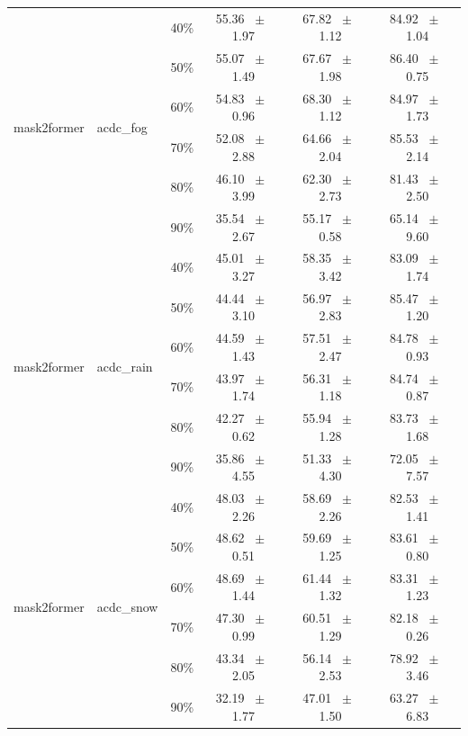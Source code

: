 \begin{table}[h]
\begin{tabular}{@{}l l c c c c@{}}
    \midrule
    \multirow{6}{*}{mask2former} & \multirow{6}{*}{acdc_fog} & 40\% & 55.36 ~$\pm$~ 1.97 & 67.82 ~$\pm$~ 1.12 & 84.92 ~$\pm$~ 1.04 \\
    & & 50\% & 55.07 ~$\pm$~ 1.49 & 67.67 ~$\pm$~ 1.98 & 86.40 ~$\pm$~ 0.75 \\
    & & 60\% & 54.83 ~$\pm$~ 0.96 & 68.30 ~$\pm$~ 1.12 & 84.97 ~$\pm$~ 1.73 \\
    & & 70\% & 52.08 ~$\pm$~ 2.88 & 64.66 ~$\pm$~ 2.04 & 85.53 ~$\pm$~ 2.14 \\
    & & 80\% & 46.10 ~$\pm$~ 3.99 & 62.30 ~$\pm$~ 2.73 & 81.43 ~$\pm$~ 2.50 \\
    & & 90\% & 35.54 ~$\pm$~ 2.67 & 55.17 ~$\pm$~ 0.58 & 65.14 ~$\pm$~ 9.60 \\
    \midrule
    \multirow{6}{*}{mask2former} & \multirow{6}{*}{acdc_rain} & 40\% & 45.01 ~$\pm$~ 3.27 & 58.35 ~$\pm$~ 3.42 & 83.09 ~$\pm$~ 1.74 \\
    & & 50\% & 44.44 ~$\pm$~ 3.10 & 56.97 ~$\pm$~ 2.83 & 85.47 ~$\pm$~ 1.20 \\
    & & 60\% & 44.59 ~$\pm$~ 1.43 & 57.51 ~$\pm$~ 2.47 & 84.78 ~$\pm$~ 0.93 \\
    & & 70\% & 43.97 ~$\pm$~ 1.74 & 56.31 ~$\pm$~ 1.18 & 84.74 ~$\pm$~ 0.87 \\
    & & 80\% & 42.27 ~$\pm$~ 0.62 & 55.94 ~$\pm$~ 1.28 & 83.73 ~$\pm$~ 1.68 \\
    & & 90\% & 35.86 ~$\pm$~ 4.55 & 51.33 ~$\pm$~ 4.30 & 72.05 ~$\pm$~ 7.57 \\
    \midrule
    \multirow{6}{*}{mask2former} & \multirow{6}{*}{acdc_snow} & 40\% & 48.03 ~$\pm$~ 2.26 & 58.69 ~$\pm$~ 2.26 & 82.53 ~$\pm$~ 1.41 \\
    & & 50\% & 48.62 ~$\pm$~ 0.51 & 59.69 ~$\pm$~ 1.25 & 83.61 ~$\pm$~ 0.80 \\
    & & 60\% & 48.69 ~$\pm$~ 1.44 & 61.44 ~$\pm$~ 1.32 & 83.31 ~$\pm$~ 1.23 \\
    & & 70\% & 47.30 ~$\pm$~ 0.99 & 60.51 ~$\pm$~ 1.29 & 82.18 ~$\pm$~ 0.26 \\
    & & 80\% & 43.34 ~$\pm$~ 2.05 & 56.14 ~$\pm$~ 2.53 & 78.92 ~$\pm$~ 3.46 \\
    & & 90\% & 32.19 ~$\pm$~ 1.77 & 47.01 ~$\pm$~ 1.50 & 63.27 ~$\pm$~ 6.83 \\
    \bottomrule
  \end{tabular}
  \label{tab:sparsity_mask2former}
\end{table}